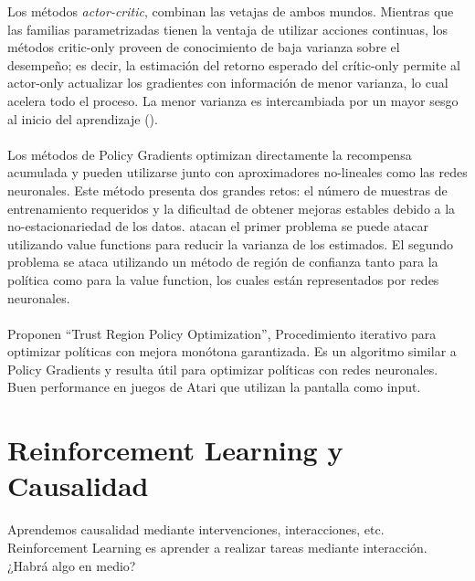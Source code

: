 \documentclass[11pt]{article}
\theoremstyle{plain}
\begin{document}
Los métodos \textit{actor-critic}, combinan las vetajas de ambos mundos. Mientras que las familias parametrizadas tienen la ventaja de utilizar acciones continuas, los métodos critic-only proveen de conocimiento de baja varianza sobre el desempeño; es decir, la estimación del retorno esperado del crític-only permite al actor-only actualizar los gradientes con información de menor varianza, lo cual acelera todo el proceso. La menor varianza es intercambiada por un mayor sesgo al inicio del aprendizaje (\cite{berenji2003convergent}). \\
\\
Los métodos de Policy Gradients optimizan directamente la recompensa acumulada y pueden utilizarse junto con aproximadores no-lineales como las redes neuronales. Este método presenta dos grandes retos: el número de muestras de entrenamiento requeridos y la dificultad de obtener mejoras estables debido a la no-estacionariedad de los datos.  \cite{DBLP:journals/corr/SchulmanMLJA15} atacan el primer problema se puede atacar utilizando value functions para reducir la varianza de los estimados. El segundo problema se ataca utilizando un método de región de confianza tanto para la política como para la value function, los cuales están representados por redes neuronales.\\
\\
 \cite{DBLP:journals/corr/SchulmanLMJA15} Proponen “Trust Region Policy Optimization”, Procedimiento iterativo para optimizar políticas con mejora monótona garantizada. Es un algoritmo similar a Policy Gradients y resulta útil para optimizar políticas con redes neuronales. Buen performance en juegos de Atari que utilizan la pantalla como input.

\section{Reinforcement Learning y Causalidad}
Aprendemos causalidad mediante intervenciones, interacciones, etc. Reinforcement Learning es aprender a realizar tareas mediante interacción. ¿Habrá algo en medio?
\end{document}
